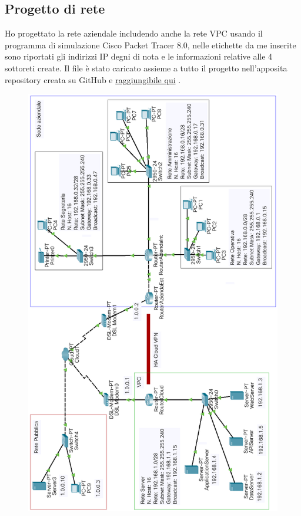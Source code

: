 \subsection{Progetto di rete} 
Ho progettato la rete aziendale includendo anche la rete VPC usando il programma di simulazione Cisco Packet Tracer 8.0, nelle etichette da me inserite sono riportati gli indirizzi IP degni di nota e le informazioni relative alle 4 sottoreti create. Il file è stato caricato assieme a tutto il progetto nell'apposita repository creata su GitHub e \href{https://github.com/MauroPello/elaborato}{raggiungibile qui} \cite{GitHub}. 
\begin{figure}[ht]
    \centering\includegraphics[scale=.51]{images/rete.png}
\end{figure}